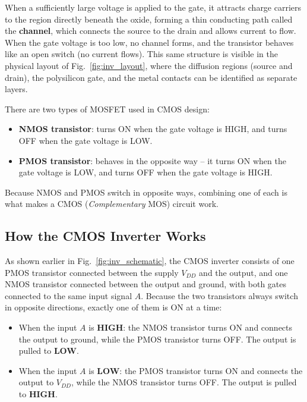 \documentclass[11pt,a4paper]{article}
\begin{document}
When a sufficiently large voltage is applied to the gate, it attracts
charge carriers to the region directly beneath the oxide, forming a thin
conducting path called the \textbf{channel}, which connects the source
to the drain and allows current to flow. When the gate voltage is too
low, no channel forms, and the transistor behaves like an open switch
(no current flows). This same structure is visible in the physical
layout of Fig.~\ref{fig:inv_layout}, where the diffusion regions (source
and drain), the polysilicon gate, and the metal contacts can be
identified as separate layers.

There are two types of MOSFET used in CMOS design:
\begin{itemize}
    \item \textbf{NMOS transistor}: turns ON when the gate voltage is
    HIGH, and turns OFF when the gate voltage is LOW.
    \item \textbf{PMOS transistor}: behaves in the opposite way -- it
    turns ON when the gate voltage is LOW, and turns OFF when the gate
    voltage is HIGH.
\end{itemize}

Because NMOS and PMOS switch in opposite ways, combining one of each is
what makes a CMOS (\emph{Complementary} MOS) circuit work.

\subsection{How the CMOS Inverter Works}
As shown earlier in Fig.~\ref{fig:inv_schematic}, the CMOS inverter
consists of one PMOS transistor connected between the supply $V_{DD}$
and the output, and one NMOS transistor connected between the output and
ground, with both gates connected to the same input signal $A$. Because
the two transistors always switch in opposite directions, exactly one of
them is ON at a time:

\begin{itemize}
    \item When the input $A$ is \textbf{HIGH}: the NMOS transistor turns
    ON and connects the output to ground, while the PMOS transistor turns
    OFF. The output is pulled to \textbf{LOW}.
    \item When the input $A$ is \textbf{LOW}: the PMOS transistor turns
    ON and connects the output to $V_{DD}$, while the NMOS transistor
    turns OFF. The output is pulled to \textbf{HIGH}.
\end{itemize}
\end{document}
